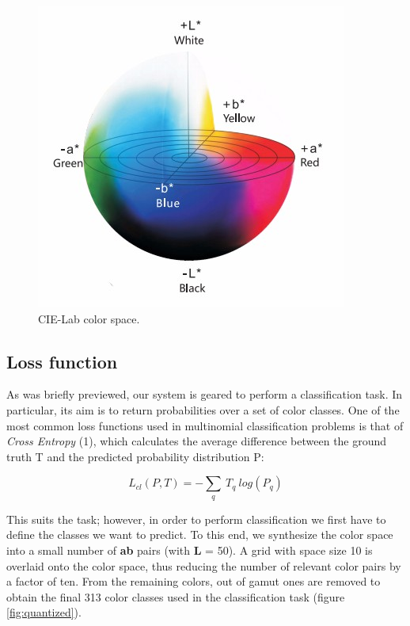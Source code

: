 \documentclass[twoside,twocolumn]{article}
\begin{document}
\begin{figure} [h]
	\includegraphics[width=\linewidth]{img/cielab.jpg}
	\caption{CIE-Lab color space.}
	\label{fig:cielab}
\end{figure}

\subsection{Loss function}
As was briefly previewed, our system is geared to perform a classification task. In particular, its aim is to return probabilities over a set of color classes. One of the most common loss functions used in multinomial classification problems is that of \textit{Cross Entropy} (1), which calculates the average difference between the ground truth T and the predicted probability distribution P:

\begin{equation}
L_{cl}(P,T) = - \sum_{q} \: T_q \: log(P_q)
\end{equation}

This suits the task; however, in order to perform classification we first have to define the classes we want to predict. To this end, we synthesize the color space into a small number of \textbf{ab} pairs (with \textbf{L} = 50). A grid with space size 10 is overlaid onto the color space, thus reducing the number of relevant color pairs by a factor of ten. From the remaining colors, out of gamut ones are removed to obtain the final 313 color classes used in the classification task (figure \ref{fig:quantized}).
\end{document}
